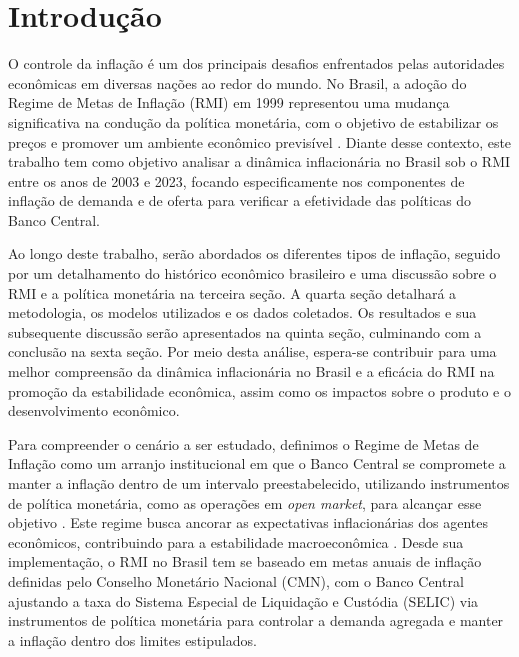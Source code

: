 \documentclass[12pt,oneside,a4paper,chapter=TITLE,english,brazil,sumario=abnt-6027-2012]{abntex2}
\begin{document}
\tableofcontents*
\cleardoublepage


\textual %
\pagestyle{simple}

\chapter{Introdução}

O controle da inflação é um dos principais desafios enfrentados pelas autoridades econômicas em diversas nações ao redor do mundo. No Brasil, a adoção do Regime de Metas de Inflação (RMI) em 1999 representou uma mudança significativa na condução da política monetária, com o objetivo de estabilizar os preços e promover um ambiente econômico previsível \cite{fraga_2003_inflation}. Diante desse contexto, este trabalho tem como objetivo analisar a dinâmica inflacionária no Brasil sob o RMI entre os anos de 2003 e 2023, focando especificamente nos componentes de inflação de demanda e de oferta para verificar a efetividade das políticas do Banco Central.

Ao longo deste trabalho, serão abordados os diferentes tipos de inflação, seguido por um detalhamento do histórico econômico brasileiro e uma discussão sobre o RMI e a política monetária na terceira seção. A quarta seção detalhará a metodologia, os modelos utilizados e os dados coletados. Os resultados e sua subsequente discussão serão apresentados na quinta seção, culminando com a conclusão na sexta seção. Por meio desta análise, espera-se contribuir para uma melhor compreensão da dinâmica inflacionária no Brasil e a eficácia do RMI na promoção da estabilidade econômica, assim como os impactos sobre o produto e o desenvolvimento econômico.

Para compreender o cenário a ser estudado, definimos o Regime de Metas de Inflação como um arranjo institucional em que o Banco Central se compromete a manter a inflação dentro de um intervalo preestabelecido, utilizando instrumentos de política monetária, como as operações em \textit{open market}, para alcançar esse objetivo \cite{svensson_1997_inflation}. Este regime busca ancorar as expectativas inflacionárias dos agentes econômicos, contribuindo para a estabilidade macroeconômica \cite{mishkin_2000_inflation}. Desde sua implementação, o RMI no Brasil tem se baseado em metas anuais de inflação definidas pelo Conselho Monetário Nacional (CMN), com o Banco Central ajustando a taxa do Sistema Especial de Liquidação e Custódia (SELIC) via instrumentos de política monetária para controlar a demanda agregada e manter a inflação dentro dos limites estipulados.
\end{document}
